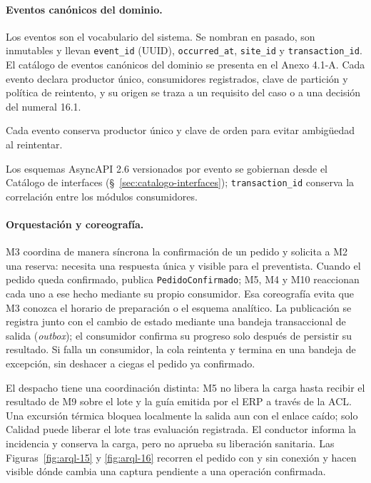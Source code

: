 \paragraph{Eventos canónicos del dominio.}
\label{subsubsec:eventos-canonicos}

Los eventos son el vocabulario del sistema. Se nombran en pasado, son inmutables y llevan \texttt{event\_id} (UUID), \texttt{occurred\_at}, \texttt{site\_id} y \texttt{transaction\_id}. El catálogo de eventos canónicos del dominio se presenta en el Anexo 4.1-A. Cada evento declara productor único, consumidores registrados, clave de partición y política de reintento, y su origen se traza a un requisito del caso o a una decisión del numeral 16.1.


Cada evento conserva productor único y clave de orden para evitar ambigüedad al reintentar.

Los esquemas AsyncAPI 2.6 versionados por evento se gobiernan desde el Catálogo de interfaces (\S~\ref{sec:catalogo-interfaces}); \texttt{transaction\_id} conserva la correlación entre los módulos consumidores.

\paragraph{Orquestación y coreografía.}
M3 coordina de manera síncrona la confirmación de un pedido y solicita a M2 una reserva: necesita una respuesta única y visible para el preventista. Cuando el pedido queda confirmado, publica \texttt{PedidoConfirmado}; M5, M4 y M10 reaccionan cada uno a ese hecho mediante su propio consumidor. Esa coreografía evita que M3 conozca el horario de preparación o el esquema analítico. La publicación se registra junto con el cambio de estado mediante una bandeja transaccional de salida (\textit{outbox}); el consumidor confirma su progreso solo después de persistir su resultado. Si falla un consumidor, la cola reintenta y termina en una bandeja de excepción, sin deshacer a ciegas el pedido ya confirmado.

El despacho tiene una coordinación distinta: M5 no libera la carga hasta recibir el resultado de M9 sobre el lote y la guía emitida por el ERP a través de la ACL. Una excursión térmica bloquea localmente la salida aun con el enlace caído; solo Calidad puede liberar el lote tras evaluación registrada. El conductor informa la incidencia y conserva la carga, pero no aprueba su liberación sanitaria. Las Figuras~\ref{fig:arql-15} y \ref{fig:arql-16} recorren el pedido con y sin conexión y hacen visible dónde cambia una captura pendiente a una operación confirmada.


